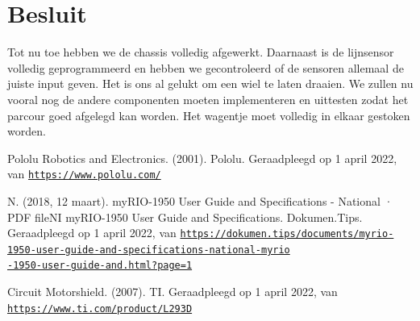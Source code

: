 \documentclass[kulak]{kulakarticle} %
\begin{document}
\section*{Besluit}
Tot nu toe hebben we de chassis volledig afgewerkt. Daarnaast is de lijnsensor  volledig geprogrammeerd en hebben we gecontroleerd of de sensoren allemaal de juiste input geven. Het is ons al gelukt om een wiel te laten draaien. We zullen nu vooral nog de andere componenten moeten implementeren en uittesten zodat het parcour goed afgelegd kan worden. Het wagentje moet volledig in elkaar gestoken worden.  
\begin{thebibliography}{9}
	
	 Pololu Robotics and Electronics. (2001). Pololu. Geraadpleegd op 1 april 2022, van  \href{https://www.pololu.com/}{\texttt{https://www.pololu.com/}}
	
	 N. (2018, 12 maart). myRIO-1950 User Guide and Specifications - National · PDF fileNI myRIO-1950 User Guide and Specifications. Dokumen.Tips. Geraadpleegd op 1 april 2022, van \href{https://dokumen.tips/documents/myrio-1950-user-guide-and-specifications-national-myrio-1950-user-guide-and.html?page=1} {\texttt{https://dokumen.tips/documents/myrio-1950-user-guide-and-specifications-national-myrio\\-1950-user-guide-and.html?page=1}}
	
	
	Circuit Motorshield. (2007). TI. Geraadpleegd op 1 april 2022, van  \href{https://www.ti.com/product/L293D}{\texttt{https://www.ti.com/product/L293D}}


	
\end{thebibliography}


\end{document}
